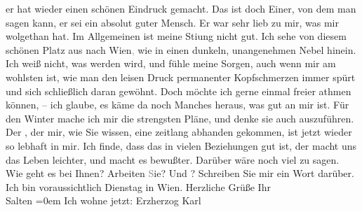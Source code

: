 \begin{ledgroupsized}[t]{13cm}
               er hat wieder einen schönen Eindruck gemacht. Das ist doch Einer, von dem man sagen
               kann, er sei ein absolut guter Mensch. Er war sehr lieb zu mir, was mir wolgethan
               hat. Im Allgemeinen ist meine Sti{\geminationm}ung nicht gut. Ich
               sehe von diesem schönen Platz aus nach Wien\textcolor{gray}{,} wie in einen dunkeln, unangenehmen Nebel hinein. Ich weiß nicht,
               was werden wird, und fühle meine Sorgen, auch wenn mir am wohlsten ist, wie man den
               leisen Druck permanenter Kopfschmerzen immer spürt und sich schließlich daran
               gewöhnt. Doch möchte ich gerne einmal freier athmen können, – ich glaube, {\pb}es käme da noch Manches
               heraus, was gut an mir ist. Für den Winter mache ich mir die strengsten Pläne, und
               denke sie auch auszuführen. Der \label{K_L03274-3v}\label{K_L03274-3h}, der mir, wie Sie wissen, eine zeitlang abhanden gekommen, ist jetzt wieder
               so lebhaft in mir. Ich finde, dass das in vielen Beziehungen gut ist, der macht uns
               das Leben leichter, und macht es bewußter. Darüber wäre noch viel zu sagen.\pend
           \pstart
           Wie geht es bei Ihnen? Arbeiten \textcolor{gray}{S}ie? Und \label{K_L03274-4v}\label{K_L03274-4h}?
               Schreiben Sie mir ein Wort darüber. Ich bin voraussichtlich Dienstag in Wien. Herzliche Grüße\pend
           \pstart
           Ihr{\\[\baselineskip]}\spacefill\mbox{Salten}\pend
           \leftskip=0em{}\pstart
           \noindent{}Ich wohne jetzt: Erzherzog Karl\pend
           
         
         \endnumbering{}\end{ledgroupsized}  \newcommand{\dateiname}{L03274}\newcommand{\titel}{Felix Salten an Arthur Schnitzler, 3. 9. [1897]}\newcommand{\editorInnen}{Martin Anton Müller und Laura Untner}
      